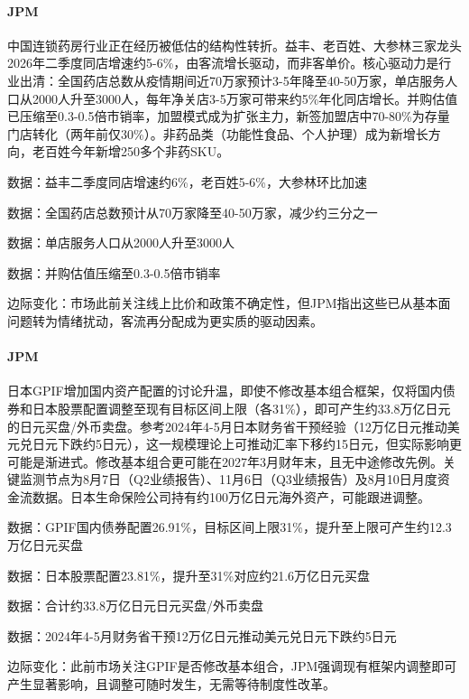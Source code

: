 \documentclass[11pt]{ctexart}
\begin{document}
\paragraph{JPM} 中国连锁药房行业正在经历被低估的结构性转折。益丰、老百姓、大参林三家龙头2026年二季度同店增速约5-6\%，由客流增长驱动，而非客单价。核心驱动力是行业出清：全国药店总数从疫情期间近70万家预计3-5年降至40-50万家，单店服务人口从2000人升至3000人，每年净关店3-5万家可带来约5\%年化同店增长。并购估值已压缩至0.3-0.5倍市销率，加盟模式成为扩张主力，新签加盟店中70-80\%为存量门店转化（两年前仅30\%）。非药品类（功能性食品、个人护理）成为新增长方向，老百姓今年新增250多个非药SKU。
{\small\color{refgray}数据：益丰二季度同店增速约6\%，老百姓5-6\%，大参林环比加速\par}
{\small\color{refgray}数据：全国药店总数预计从70万家降至40-50万家，减少约三分之一\par}
{\small\color{refgray}数据：单店服务人口从2000人升至3000人\par}
{\small\color{refgray}数据：并购估值压缩至0.3-0.5倍市销率\par}
{\small\color{refgray}边际变化：市场此前关注线上比价和政策不确定性，但JPM指出这些已从基本面问题转为情绪扰动，客流再分配成为更实质的驱动因素。\par}
\paragraph{JPM} 日本GPIF增加国内资产配置的讨论升温，即使不修改基本组合框架，仅将国内债券和日本股票配置调整至现有目标区间上限（各31\%），即可产生约33.8万亿日元的日元买盘/外币卖盘。参考2024年4-5月日本财务省干预经验（12万亿日元推动美元兑日元下跌约5日元），这一规模理论上可推动汇率下移约15日元，但实际影响更可能是渐进式。修改基本组合更可能在2027年3月财年末，且无中途修改先例。关键监测节点为8月7日（Q2业绩报告）、11月6日（Q3业绩报告）及8月10日月度资金流数据。日本生命保险公司持有约100万亿日元海外资产，可能跟进调整。
{\small\color{refgray}数据：GPIF国内债券配置26.91\%，目标区间上限31\%，提升至上限可产生约12.3万亿日元买盘\par}
{\small\color{refgray}数据：日本股票配置23.81\%，提升至31\%对应约21.6万亿日元买盘\par}
{\small\color{refgray}数据：合计约33.8万亿日元日元买盘/外币卖盘\par}
{\small\color{refgray}数据：2024年4-5月财务省干预12万亿日元推动美元兑日元下跌约5日元\par}
{\small\color{refgray}边际变化：此前市场关注GPIF是否修改基本组合，JPM强调现有框架内调整即可产生显著影响，且调整可随时发生，无需等待制度性改革。\par}
\end{document}
